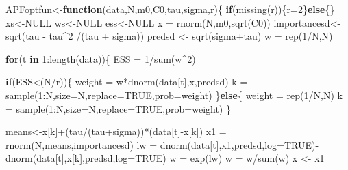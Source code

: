 \documentclass[
]{article}
\newenvironment{Shaded}{\begin{snugshade}}{\end{snugshade}}
\newcommand{\AttributeTok}[1]{\textcolor[rgb]{0.77,0.63,0.00}{#1}}
\newcommand{\ConstantTok}[1]{\textcolor[rgb]{0.00,0.00,0.00}{#1}}
\newcommand{\ControlFlowTok}[1]{\textcolor[rgb]{0.13,0.29,0.53}{\textbf{#1}}}
\newcommand{\DecValTok}[1]{\textcolor[rgb]{0.00,0.00,0.81}{#1}}
\newcommand{\FunctionTok}[1]{\textcolor[rgb]{0.00,0.00,0.00}{#1}}
\newcommand{\NormalTok}[1]{#1}
\newcommand{\OtherTok}[1]{\textcolor[rgb]{0.56,0.35,0.01}{#1}}
\newcommand{\SpecialCharTok}[1]{\textcolor[rgb]{0.00,0.00,0.00}{#1}}
\begin{document}
\begin{Shaded}
\begin{Highlighting}[]
\NormalTok{APFoptfun}\OtherTok{\textless{}{-}}\ControlFlowTok{function}\NormalTok{(data,N,m0,C0,tau,sigma,r)\{}
  \ControlFlowTok{if}\NormalTok{(}\FunctionTok{missing}\NormalTok{(r))\{r}\OtherTok{=}\DecValTok{2}\NormalTok{\}}\ControlFlowTok{else}\NormalTok{\{\}}
\NormalTok{  xs}\OtherTok{\textless{}{-}}\ConstantTok{NULL}
\NormalTok{  ws}\OtherTok{\textless{}{-}}\ConstantTok{NULL}
\NormalTok{  ess}\OtherTok{\textless{}{-}}\ConstantTok{NULL}
\NormalTok{  x  }\OtherTok{=} \FunctionTok{rnorm}\NormalTok{(N,m0,}\FunctionTok{sqrt}\NormalTok{(C0))}
\NormalTok{  importancesd}\OtherTok{\textless{}{-}}\FunctionTok{sqrt}\NormalTok{(tau }\SpecialCharTok{{-}}\NormalTok{ tau}\SpecialCharTok{\^{}}\DecValTok{2} \SpecialCharTok{/}\NormalTok{(tau }\SpecialCharTok{+}\NormalTok{ sigma))}
\NormalTok{  predsd }\OtherTok{\textless{}{-}} \FunctionTok{sqrt}\NormalTok{(sigma}\SpecialCharTok{+}\NormalTok{tau)}
\NormalTok{  w  }\OtherTok{=} \FunctionTok{rep}\NormalTok{(}\DecValTok{1}\SpecialCharTok{/}\NormalTok{N,N)}
  
  \ControlFlowTok{for}\NormalTok{(t }\ControlFlowTok{in} \DecValTok{1}\SpecialCharTok{:}\FunctionTok{length}\NormalTok{(data))\{}
\NormalTok{    ESS  }\OtherTok{=} \DecValTok{1}\SpecialCharTok{/}\FunctionTok{sum}\NormalTok{(w}\SpecialCharTok{\^{}}\DecValTok{2}\NormalTok{)}
    
    \ControlFlowTok{if}\NormalTok{(ESS}\SpecialCharTok{\textless{}}\NormalTok{(N}\SpecialCharTok{/}\NormalTok{r))\{}
\NormalTok{    weight }\OtherTok{=}\NormalTok{ w}\SpecialCharTok{*}\FunctionTok{dnorm}\NormalTok{(data[t],x,predsd)}
\NormalTok{    k   }\OtherTok{=} \FunctionTok{sample}\NormalTok{(}\DecValTok{1}\SpecialCharTok{:}\NormalTok{N,}\AttributeTok{size=}\NormalTok{N,}\AttributeTok{replace=}\ConstantTok{TRUE}\NormalTok{,}\AttributeTok{prob=}\NormalTok{weight)}
\NormalTok{    \}}\ControlFlowTok{else}\NormalTok{\{}
\NormalTok{    weight }\OtherTok{=} \FunctionTok{rep}\NormalTok{(}\DecValTok{1}\SpecialCharTok{/}\NormalTok{N,N)}
\NormalTok{    k   }\OtherTok{=} \FunctionTok{sample}\NormalTok{(}\DecValTok{1}\SpecialCharTok{:}\NormalTok{N,}\AttributeTok{size=}\NormalTok{N,}\AttributeTok{replace=}\ConstantTok{TRUE}\NormalTok{,}\AttributeTok{prob=}\NormalTok{weight)}
\NormalTok{    \}}
    
\NormalTok{    means}\OtherTok{\textless{}{-}}\NormalTok{x[k]}\SpecialCharTok{+}\NormalTok{(tau}\SpecialCharTok{/}\NormalTok{(tau}\SpecialCharTok{+}\NormalTok{sigma))}\SpecialCharTok{*}\NormalTok{(data[t]}\SpecialCharTok{{-}}\NormalTok{x[k])}
\NormalTok{    x1   }\OtherTok{=} \FunctionTok{rnorm}\NormalTok{(N,means,importancesd)}
\NormalTok{    lw  }\OtherTok{=} \FunctionTok{dnorm}\NormalTok{(data[t],x1,predsd,}\AttributeTok{log=}\ConstantTok{TRUE}\NormalTok{)}\SpecialCharTok{{-}}\FunctionTok{dnorm}\NormalTok{(data[t],x[k],predsd,}\AttributeTok{log=}\ConstantTok{TRUE}\NormalTok{)}
\NormalTok{    w   }\OtherTok{=} \FunctionTok{exp}\NormalTok{(lw)}
\NormalTok{    w   }\OtherTok{=}\NormalTok{ w}\SpecialCharTok{/}\FunctionTok{sum}\NormalTok{(w)}
\NormalTok{    x }\OtherTok{\textless{}{-}}\NormalTok{ x1}
   

\end{Highlighting}
\end{Shaded}
\end{document}
